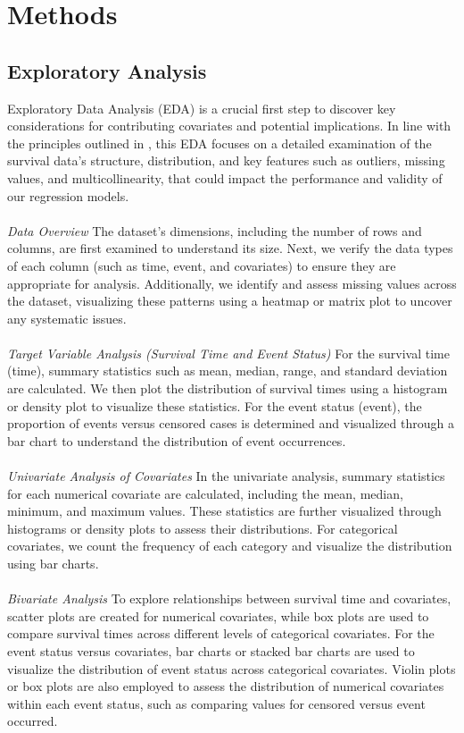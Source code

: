 \section{Methods} \label{methods}
\subsection{Exploratory Analysis}
Exploratory Data Analysis (EDA) is a crucial first step to discover key considerations for contributing covariates and potential implications. In line with the principles outlined in \parencite{harrell__regression_2015}, this EDA focuses on a detailed examination of the survival data's structure, distribution, and key features such as outliers, missing values, and multicollinearity, that could impact the performance and validity of our regression models.
\\\\
\noindent \textit{Data Overview} The dataset's dimensions, including the number of rows and columns, are first examined to understand its size. Next, we verify the data types of each column (such as time, event, and covariates) to ensure they are appropriate for analysis. Additionally, we identify and assess missing values across the dataset, visualizing these patterns using a heatmap or matrix plot to uncover any systematic issues.
\\\\
\noindent \textit{Target Variable Analysis (Survival Time and Event Status)} For the survival time (time), summary statistics such as mean, median, range, and standard deviation are calculated. We then plot the distribution of survival times using a histogram or density plot to visualize these statistics. For the event status (event), the proportion of events versus censored cases is determined and visualized through a bar chart to understand the distribution of event occurrences.
\\\\
\noindent \textit{Univariate Analysis of Covariates} In the univariate analysis, summary statistics for each numerical covariate are calculated, including the mean, median, minimum, and maximum values. These statistics are further visualized through histograms or density plots to assess their distributions. For categorical covariates, we count the frequency of each category and visualize the distribution using bar charts.
\\\\
\noindent \textit{Bivariate Analysis} To explore relationships between survival time and covariates, scatter plots are created for numerical covariates, while box plots are used to compare survival times across different levels of categorical covariates. For the event status versus covariates, bar charts or stacked bar charts are used to visualize the distribution of event status across categorical covariates. Violin plots or box plots are also employed to assess the distribution of numerical covariates within each event status, such as comparing values for censored versus event occurred.
